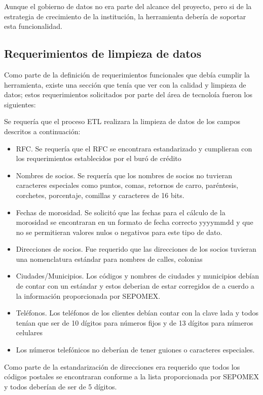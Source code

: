 \documentclass[a4paper,openright,12pt]{book}
\begin{document}
Aunque el gobierno de datos no era parte del alcance del proyecto, pero si de la estrategia de crecimiento de la instituci\'on, la herramienta deber\'ia de soportar esta funcionalidad.

\subsection{Requerimientos de limpieza de datos}
Como parte de la definici\'on de requerimientos funcionales que deb\'ia cumplir la herramienta, existe una secci\'on que ten\'ia que ver con la calidad y limpieza de datos; estos requerimientos solicitados por parte del \'area de tecnolo\'ia fueron los siguientes: 

Se requer\'ia que el proceso ETL realizara la limpieza de datos de los campos descritos a continuaci\'on: 
\begin{itemize}
\item RFC. Se requer\'ia que el RFC se encontrara estandarizado y cumplieran con los requerimientos establecidos por el bur\'o de cr\'edito
\item Nombres de socios. Se requer\'ia que los nombres de socios no tuvieran caracteres especiales como puntos, comas, retornos de carro, par\'entesis, corchetes, porcentaje, comillas y caracteres de 16 bits.
\item Fechas de morosidad. Se solicit\'o que las fechas para el c\'alculo de la morosidad se encontraran en un formato de fecha correcto yyyymmdd y que no se permitieran valores nulos o negativos para este tipo de dato.
\item Direcciones de socios. Fue requerido que las direcciones de los socios tuvieran una nomenclatura est\'andar para nombres de calles, colonias
\item Ciudades/Municipios. Los c\'odigos y nombres de ciudades y municipios deb\'ian de contar con un est\'andar y estos deberian de estar corregidos de a cuerdo a la informaci\'on proporcionada por SEPOMEX.
\item Tel\'efonos. Los tel\'efonos de los clientes deb\'ian contar con la clave lada y todos ten\'ian que ser de 10 d\'igitos para n\'umeros fijos y de 13 d\'igitos para n\'umeros celulares
\item Los n\'umeros telef\'onicos no deber\'ian de tener guiones o caracteres especiales.
\end{itemize}

Como parte de la estandarizaci\'on de direcciones era requerido que todos los c\'odigos postales se encontraran conforme a la lista proporcionada por SEPOMEX y todos deber\'ian de ser de 5 d\'igitos.
\end{document}
